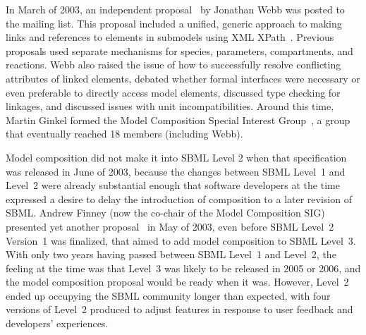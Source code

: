 In March of 2003, an independent proposal~\cite{x} by Jonathan Webb was
posted to the 
mailing list.  This proposal included a unified, generic approach to
making links and references to elements in submodels using XML
XPath~\cite{x}.  Previous proposals used separate mechanisms for
species, parameters, compartments, and reactions.  Webb also raised the
issue of how to successfully resolve conflicting attributes of linked
elements, debated whether formal interfaces were necessary or even
preferable to directly access model elements, discussed type checking
for linkages, and discussed issues with unit incompatibilities.  Around
this time, Martin Ginkel formed the Model Composition Special Interest
Group~\cite{x}, a group that eventually reached 18 members (including
Webb).

Model composition did not make it into SBML Level 2 when that
specification was released in June of 2003, because the changes between
SBML Level~1 and Level~2 were already substantial enough that software
developers at the time expressed a desire to delay the introduction of
composition to a later revision of SBML.  Andrew Finney (now the
co-chair of the Model Composition SIG) presented yet another
proposal~\cite{x} in May of 2003, even before SBML Level~2 Version~1 was
finalized, that aimed to add model composition to SBML Level~3.  With
only two years having passed between SBML Level~1 and Level~2, the
feeling at the time was that Level~3 was likely to be released in 2005
or 2006, and the model composition proposal would be ready when it was.
However, Level~2 ended up occupying the SBML community longer than
expected, with four versions of Level~2 produced to adjust features in
response to user feedback and developers' experiences.

